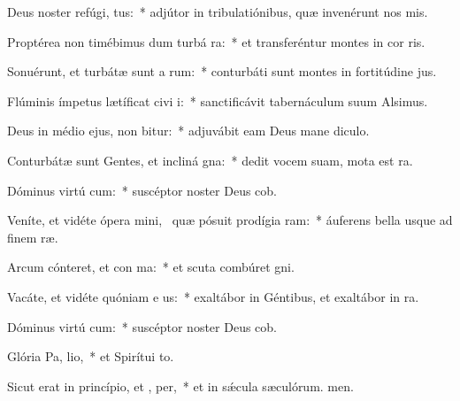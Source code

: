 \item Deus noster refúgi,  tus:~* adjútor in tribulatiónibus, quæ invenérunt nos mis.
\item Proptérea non timébimus dum turbá ra:~* et transferéntur montes in cor ris.
\item Sonuérunt, et turbátæ sunt a rum:~* conturbáti sunt montes in fortitúdine jus.
\item Flúminis ímpetus lætíficat civi i:~* sanctificávit tabernáculum suum Alsimus.
\item Deus in médio ejus, non bitur:~* adjuvábit eam Deus mane diculo.
\item Conturbátæ sunt Gentes, et incliná  gna:~* dedit vocem suam, mota est ra.
\item Dóminus virtú cum:~* suscéptor noster Deus cob.
\item Veníte, et vidéte ópera mini,~\pscross{} quæ pósuit prodígia  ram:~* áuferens bella usque ad finem ræ.
\item Arcum cónteret, et con ma:~* et scuta combúret gni.
\item Vacáte, et vidéte quóniam e  us:~* exaltábor in Géntibus, et exaltábor in ra.
\item Dóminus virtú cum:~* suscéptor noster Deus cob.
\item Glória Pa,  lio,~* et Spirítui to.
\item Sicut erat in princípio, et ,  per,~* et in sǽcula sæculórum. men.
